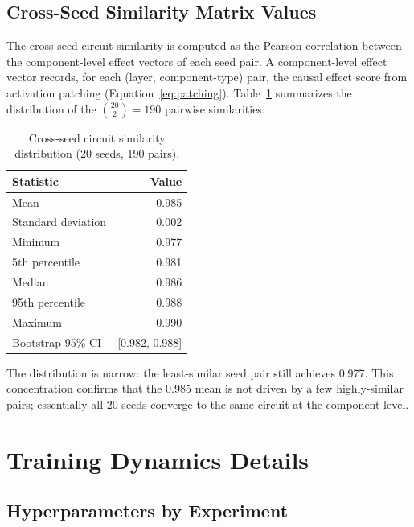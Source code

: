 \subsection{Cross-Seed Similarity Matrix Values}
\label{app:similarity_matrix}

The cross-seed circuit similarity is computed as the Pearson correlation between the
component-level effect vectors of each seed pair. A component-level effect vector records,
for each (layer, component-type) pair, the causal effect score from activation patching
(Equation~\ref{eq:patching}). Table~\ref{tab:similarity_summary} summarizes the distribution
of the $\binom{20}{2} = 190$ pairwise similarities.

\begin{table}[h]
\centering
\caption{Cross-seed circuit similarity distribution (20 seeds, 190 pairs).}
\label{tab:similarity_summary}
\begin{tabular}{lr}
\toprule
Statistic & Value \\
\midrule
Mean & 0.985 \\
Standard deviation & 0.002 \\
Minimum & 0.977 \\
5th percentile & 0.981 \\
Median & 0.986 \\
95th percentile & 0.988 \\
Maximum & 0.990 \\
Bootstrap 95\% CI & [0.982, 0.988] \\
\bottomrule
\end{tabular}
\end{table}

\noindent The distribution is narrow: the least-similar seed pair still achieves 0.977. This
concentration confirms that the 0.985 mean is not driven by a few highly-similar pairs;
essentially all 20 seeds converge to the same circuit at the component level.

\clearpage

\section{Training Dynamics Details}
\label{app:training_details}

\subsection{Hyperparameters by Experiment}

